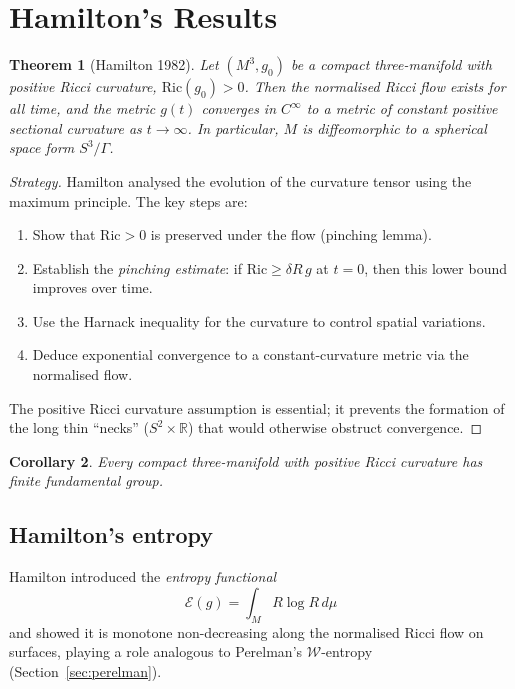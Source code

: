 \documentclass[12pt,a4paper]{amsart}
\newtheorem{theorem}{Theorem}[section]
\newtheorem{corollary}[theorem]{Corollary}
\theoremstyle{definition}
\theoremstyle{remark}
\newcommand{\R}{\mathbb{R}}
\newcommand{\Ric}{\mathrm{Ric}}
\begin{document}
\section{Hamilton's Results}
\label{sec:hamilton}

\begin{theorem}[Hamilton 1982]
\label{thm:hamilton82}
Let $(M^3, g_0)$ be a compact three-manifold with positive Ricci curvature,
$\Ric(g_0) > 0$.  Then the normalised Ricci flow exists for all time, and the
metric $g(t)$ converges in $C^\infty$ to a metric of constant positive
sectional curvature as $t\to\infty$.  In particular, $M$ is diffeomorphic to a
spherical space form $S^3/\Gamma$.
\end{theorem}

\begin{proof}[Strategy]
Hamilton analysed the evolution of the curvature tensor using the maximum
principle.  The key steps are:
\begin{enumerate}[label=(\roman*)]
  \item Show that $\Ric > 0$ is preserved under the flow (pinching lemma).
  \item Establish the \emph{pinching estimate}: if $\Ric \geq \delta R\, g$ at
    $t = 0$, then this lower bound improves over time.
  \item Use the Harnack inequality for the curvature to control spatial
    variations.
  \item Deduce exponential convergence to a constant-curvature metric via
    the normalised flow.
\end{enumerate}
The positive Ricci curvature assumption is essential; it prevents the
formation of the long thin ``necks'' ($S^2 \times \R$) that would otherwise
obstruct convergence.
\end{proof}

\begin{corollary}
Every compact three-manifold with positive Ricci curvature has finite
fundamental group.
\end{corollary}

\subsection{Hamilton's entropy}

Hamilton introduced the \emph{entropy functional}
\[
  \mathcal{E}(g) = \int_M R \log R\, d\mu
\]
and showed it is monotone non-decreasing along the normalised Ricci flow on
surfaces, playing a role analogous to Perelman's $\mathcal{W}$-entropy
(Section~\ref{sec:perelman}).
\end{document}
